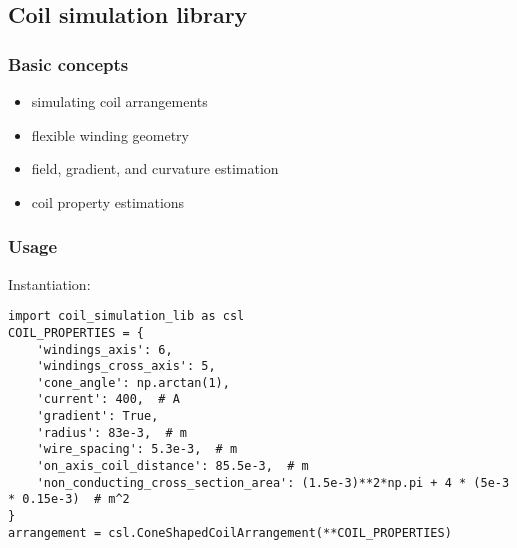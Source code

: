 \begin{frame}
    \section{Coil simulation library}
\end{frame}

\begin{frame}
    \frametitle{Basic concepts}
    \begin{itemize}
        \item simulating coil arrangements
        \item flexible winding geometry
        \item field, gradient, and curvature estimation
        \item coil property estimations
    \end{itemize}
\end{frame}

\begin{frame}[fragile]
    \frametitle{Usage}
    Instantiation:
    \begin{lstlisting}
import coil_simulation_lib as csl
COIL_PROPERTIES = {
    'windings_axis': 6,
    'windings_cross_axis': 5,
    'cone_angle': np.arctan(1),
    'current': 400,  # A
    'gradient': True,
    'radius': 83e-3,  # m
    'wire_spacing': 5.3e-3,  # m
    'on_axis_coil_distance': 85.5e-3,  # m
    'non_conducting_cross_section_area': (1.5e-3)**2*np.pi + 4 * (5e-3 * 0.15e-3)  # m^2
}
arrangement = csl.ConeShapedCoilArrangement(**COIL_PROPERTIES)
    \end{lstlisting}
\end{frame}

